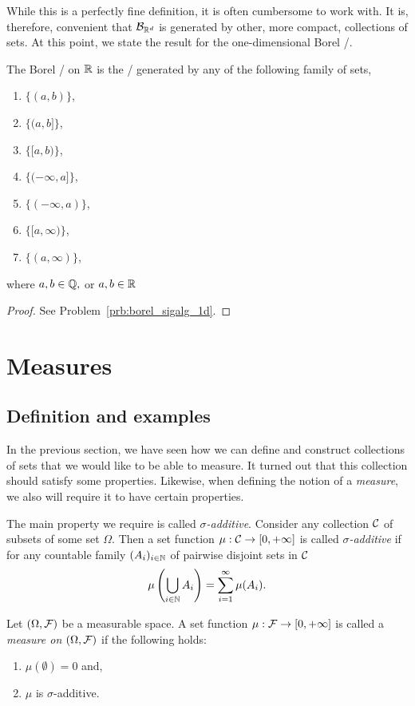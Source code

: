 While this is a perfectly fine definition, it is often cumbersome to work with. It is, therefore, convenient that $\mathcal B_{\mathbb R^d}$ is generated by other, more compact, collections of sets. At this point, we state the result for the one-dimensional Borel \sigalg/. 

\begin{proposition}\label{prop:characterization_borel_sigalg_1d}
The Borel \sigalg/ on $\mathbb R$ is the \sigalg/ generated by any of the following family of sets, 
\begin{enumerate}[label={(\arabic*)}]
\item $\{(a, b)\}$,
\item $\{(a, b]\}$,
\item $\{[a, b)\}$,
\item $\{(-\infty,a]\}$,
\item $\{(-\infty,a)\}$,
\item $\{[a, \infty)\}$,
\item $\{(a,\infty)\}$,
\end{enumerate}
where $a, b \in \mathbb Q,$ or $a, b \in \mathbb R$
\end{proposition}

\begin{proof}
See Problem~\ref{prb:borel_sigalg_1d}.
\end{proof}

\section{Measures}

\subsection{Definition and examples}
In the previous section, we have seen how we can define and construct collections of sets that we would like to be able to measure. It turned out that this collection should satisfy some properties. Likewise, when defining the notion of a \emph{measure}, we also will require it to have certain properties.

The main property we require is called \emph{$\sigma$-additive}. Consider any collection $\mathcal C$ of subsets of some set $\Omega$. Then a set function $\mu : \mathcal C \to [0,+\infty]$ is called \emph{$\sigma$-additive} if for any countable family $(A_i)_{i \in \mathbb N}$ of pairwise disjoint sets in $\mathcal C$
\[
	\mu\left(\bigcup_{i \in \mathbb N} A_i\right) = \sum_{i = 1}^\infty \mu(A_i).
\]

\begin{definition}[Measure]\label{def:measure}
Let $(\Omega, \mathcal F)$ be a measurable space. A set function $\mu : \mathcal F \to [0,+\infty]$ is called a \emph{measure on $(\Omega, \mathcal F)$} if the following holds:
\begin{enumerate}[label={(\arabic*)}]
\item $\mu(\emptyset) = 0$ and,
\item $\mu$ is $\sigma$-additive.
\end{enumerate}
\end{definition}

